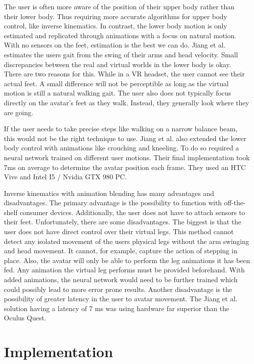 \documentclass{vgtc}                          %
\begin{document}
    The user is often more aware of the position of their upper body rather than their lower body. Thus requiring more accurate algorithms for upper body control, like inverse kinematics. In contrast, the lower body motion is only estimated and replicated through animations with a focus on natural motion. With no sensors on the feet, estimation is the best we can do. Jiang et al. estimates the users gait from the swing of their arms and head velocity. Small discrepancies between the real and virtual worlds in the lower body is okay. There are two reasons for this. While in a VR headset, the user cannot see their actual feet. A small difference will not be perceptible as long as the virtual motion is still a natural walking gait. The user also does not typically focus directly on the avatar's feet as they walk. Instead, they generally look where they are going. 
    
    If the user needs to take precise steps like walking on a narrow balance beam, this would not be the right technique to use. Jiang et al. also extended the lower body control with animations like crouching and kneeling.  To do so required a neural network trained on different user motions. Their final implementation took 7ms on average to determine the avatar position each frame. They used an HTC Vive and Intel I5 / Nvidia GTX 980 PC.

   Inverse kinematics with animation blending has many advantages and disadvantages. The primary advantage is the possibility to function with off-the-shelf consumer devices. Additionally, the user does not have to attach sensors to their feet.  Unfortunately, there are some disadvantages. The biggest is that the user does not have direct control over their virtual legs. This method cannot detect any isolated movement of the users physical legs without the arm swinging and head movement. It cannot, for example, capture the action of stepping in place. Also, the avatar will only be able to perform the leg animations it has been fed. Any animation the virtual leg performs must be provided beforehand. With added animations, the neural network would need to be further trained which could possibly lead to more error prone results. Another disadvantage is the possibility of greater latency in the user to avatar movement. The Jiang et al. \cite{Real-Time} solution having a latency of 7 ms was using hardware far superior than the Oculus Quest.
    
\section{Implementation}
\end{document}
